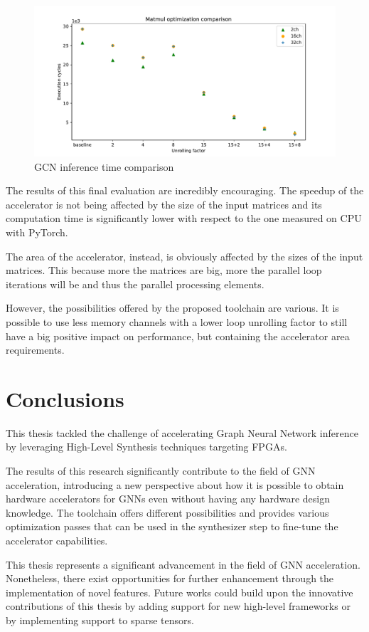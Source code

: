 \documentclass[11pt,a4paper,twocolumn]{article}
\begin{document}
\begin{figure}[t]
    \centering
    \includegraphics[height=0.24\textwidth]{Images/matmul_comparison15}
    \caption{GCN inference time comparison}
    \label{fig:gcn-inference-comparison}
\end{figure}

The results of this final evaluation are incredibly encouraging.
The speedup of the accelerator is not being affected by the size of the input matrices and its computation time is significantly lower with respect to the one measured on CPU with PyTorch.

The area of the accelerator, instead, is obviously affected by the sizes of the input matrices.
This because more the matrices are big, more the parallel loop iterations will be and thus the parallel processing elements.

However, the possibilities offered by the proposed toolchain are various.
It is possible to use less memory channels with a lower loop unrolling factor to still have a big positive impact on performance, but containing the accelerator area requirements.

\section{Conclusions}
This thesis tackled the challenge of accelerating Graph Neural Network inference by leveraging High-Level Synthesis techniques targeting FPGAs.

The results of this research significantly contribute to the field of GNN acceleration, introducing a new perspective about how it is possible to obtain hardware accelerators for GNNs even without having any hardware design knowledge.
The toolchain offers different possibilities and provides various optimization passes that can be used in the synthesizer step to fine-tune the accelerator capabilities.

This thesis represents a significant advancement in the field of GNN acceleration.
Nonetheless, there exist opportunities for further enhancement through the implementation of novel features.
Future works could build upon the innovative contributions of this thesis by adding support for new high-level frameworks or by implementing support to sparse tensors.


\end{document}
